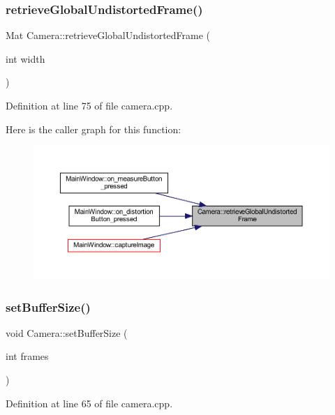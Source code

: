 \subsubsection{\texorpdfstring{retrieveGlobalUndistortedFrame()}{retrieveGlobalUndistortedFrame()}}
{\footnotesize\ttfamily Mat Camera\+::retrieve\+Global\+Undistorted\+Frame (\begin{DoxyParamCaption}\item[{int}]{width }\end{DoxyParamCaption})}



Definition at line 75 of file camera.\+cpp.

Here is the caller graph for this function\+:
\nopagebreak
\begin{figure}[H]
\begin{center}
\leavevmode
\includegraphics[width=350pt]{classCamera_a9b9c3210f57f3646f19e31904d5a0544_icgraph}
\end{center}
\end{figure}
\mbox{\label{classCamera_a74895f8b2414f9d5cc84682b096e0d66}} 
\subsubsection{\texorpdfstring{setBufferSize()}{setBufferSize()}}
{\footnotesize\ttfamily void Camera\+::set\+Buffer\+Size (\begin{DoxyParamCaption}\item[{int}]{frames }\end{DoxyParamCaption})}



Definition at line 65 of file camera.\+cpp.

\mbox{\label{classCamera_a9c9ba5d6bed27bdd033ea40280741cf9}} 

